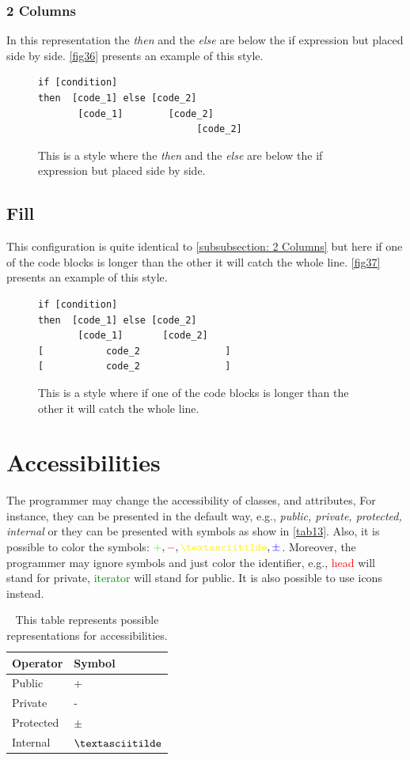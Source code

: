 \subsubsection{2 Columns} \label{subsubsection: 2 Columns}
In this representation the \textit{then} and the \textit{else} are below the if expression but placed side by side. \autoref{fig36} presents an example of this style.
\begin{figure}[H]
\begin{lstlisting}
if [condition]
then  [code_1] else [code_2]
	   [code_1]        [code_2]
				 		    [code_2]
\end{lstlisting}
\caption{This is a style where the \textit{then} and the \textit{else} are below the if expression but placed side by side.}
\label{fig36}
\end{figure}
\subsection{Fill}
This configuration is quite identical to \autoref{subsubsection: 2 Columns} but here if one of the code blocks is longer than the other it will catch the whole line. \autoref{fig37} presents an example of this style.
\begin{figure}[H]
\begin{lstlisting}
if [condition]
then  [code_1] else [code_2]
	   [code_1]       [code_2]
[			code_2			     ]
[			code_2			     ]
\end{lstlisting}
\caption{This is a style where if one of the code blocks is longer than the other it will catch the whole line.}
\label{fig37}
\end{figure}
\section{Accessibilities}
The programmer may change the accessibility of classes, and attributes, For instance, they can be presented in the default way, e.g., \textit{public, private, protected, internal} or they can be presented with symbols as show in \autoref{tab13}. Also, it is possible to color the symbols:
$ \textcolor{green}{+}, \textcolor{red}{-}, \textcolor{yellow}{\textasciitilde}, \textcolor{blue}{\pm} $. Moreover, the programmer may ignore symbols and just color the identifier, e.g., \textcolor{red}{head} will stand for private, \textcolor{green}{iterator} will stand for public. It is also possible to use icons instead.
\begin{table}[H]
\centering
\begin{tabular}{|l|l|}
\hline
{\bf Operator} & {\bf Symbol} \\ \hline
Public & + \\ \hline
Private & - \\ \hline
Protected & $ \pm $ \\ \hline
Internal & $ \textasciitilde $ \\ \hline
\end{tabular}
\caption{This table represents possible representations for accessibilities.}
\label{tab13}
\end{table}
